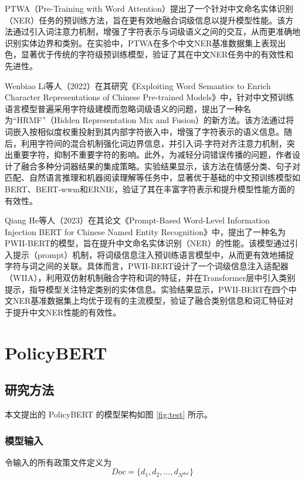 \documentclass[12pt, a4paper]{ctexart}
\begin{document}
PTWA（Pre-Training with Word Attention）提出了一个针对中文命名实体识别（NER）任务的预训练方法，旨在更有效地融合词级信息以提升模型性能\cite{Ma2021PTWAPW}。该方法通过引入词注意力机制，增强了字符表示与词级语义之间的交互，从而更准确地识别实体边界和类别。在实验中，PTWA在多个中文NER基准数据集上表现出色，显著优于传统的字符级预训练模型，验证了其在中文NER任务中的有效性和先进性。

Wenbiao Li等人（2022）在其研究《Exploiting Word Semantics to Enrich Character Representations of Chinese Pre-trained Models》中，针对中文预训练语言模型普遍采用字符级建模而忽略词级语义的问题，提出了一种名为“HRMF”（Hidden Representation Mix and Fusion）的新方法\cite{Li2022ExploitingWS}。该方法通过将词嵌入按相似度权重投射到其内部字符嵌入中，增强了字符表示的语义信息。随后，利用字符间的混合机制强化词边界信息，并引入词-字符对齐注意力机制，突出重要字符，抑制不重要字符的影响。此外，为减轻分词错误传播的问题，作者设计了融合多种分词器结果的集成策略。实验结果显示，该方法在情感分类、句子对匹配、自然语言推理和机器阅读理解等任务中，显著优于基础的中文预训练模型如BERT、BERT-wwm和ERNIE，验证了其在丰富字符表示和提升模型性能方面的有效性。

Qiang He等人（2023）在其论文《Prompt-Based Word-Level Information Injection BERT for Chinese Named Entity Recognition》中，提出了一种名为PWII-BERT的模型，旨在提升中文命名实体识别（NER）的性能\cite{He2023PromptBasedWI}。该模型通过引入提示（prompt）机制，将词级信息注入预训练语言模型中，从而更有效地捕捉字符与词之间的关联。具体而言，PWII-BERT设计了一个词级信息注入适配器（WIIA），利用双仿射机制融合字符和词的特征，并在Transformer层中引入类别提示，指导模型关注特定类别的实体信息。实验结果显示，PWII-BERT在四个中文NER基准数据集上均优于现有的主流模型，验证了融合类别信息和词汇特征对于提升中文NER性能的有效性。 



\section{PolicyBERT}
\subsection{研究方法}

本文提出的 PolicyBERT 的模型架构如图 \ref{fig:test} 所示。

\subsubsection{模型输入}
令输入的所有政策文件定义为 
\begin{equation}
    Doc = \{d_1, d_2, \dots, d_{N^{doc}}\} 
\end{equation}
\end{document}
